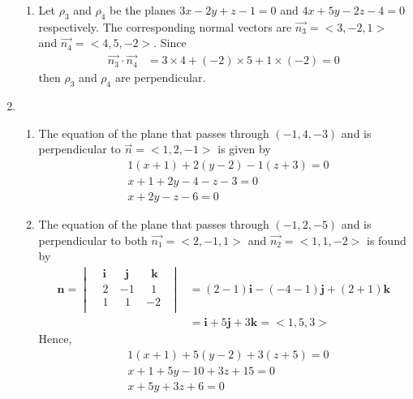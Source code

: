 \documentclass[12pt]{amsart}
\begin{document}
\begin{enumerate}
\begin{enumerate}
			\item Let $\rho_3$ and $\rho_4$ be the planes $3x-2y+z-1=0$ and $4x+5y-2z-4=0$ 						respectively. The corresponding normal vectors are $\vec{n_3}=\big<3,-2,1\big>$ and 
				$\vec{n_4}=\big<4,5,-2\big>$.  Since 
				\begin{align*}
					\vec{n_3}\cdot\vec{n_4} &= 3\times4+(-2)\times5+1\times(-2)=0
				\end{align*}
				then $\rho_3$ and $\rho_4$ are perpendicular. \\
			
		\end{enumerate}
		
	\item
		\begin{enumerate}
		
			\item The equation of the plane that passes through $(-1,4,-3)$ and is perpendicular to 
				$\vec{n}=\big<1,2,-1\big>$ is given by
					\begin{align*}
						&1(x+1)+2(y-2)-1(z+3)=0 \\
						&x+1+2y-4-z-3=0 \\
						&x+2y-z-6=0
					\end{align*}	
							
			\item The equation of the plane that passes through $(-1,2,-5)$ and is perpendicular to both
				$\vec{n_1}=\big<2,-1,1\big>$ and $\vec{n_2}=\big<1,1,-2\big>$ is found by
					\begin{align*}
						\mathbf{n}=
							\begin{vmatrix}
								&\mathbf{i} \ &\ \ \mathbf{j} \ & \ \ \mathbf{k} \ \ \\
								&2 \ &-1 \ &\ \ 1 \ \ \\
								&1 \ &\ \ 1 \ &-2 \ \ \\
							\end{vmatrix} 
							&=(2-1)\mathbf{i}-(-4-1)\mathbf{j}+(2+1)\mathbf{k} \\
							&=\mathbf{i}+5\mathbf{j}+3\mathbf{k} = \big<1,5,3\big>
					\end{align*}
					Hence,
					\begin{align*}
						&1(x+1)+5(y-2)+3(z+5)=0 \\
						&x+1+5y-10+3z+15=0 \\
						&x+5y+3z+6=0
					\end{align*}
		\end{enumerate}
		
\end{enumerate}
\end{document}
